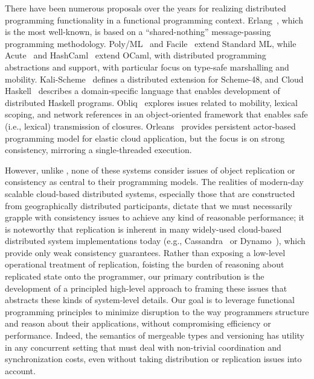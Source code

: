 There have been numerous proposals over the years for realizing
distributed programming functionality in a functional programming
context.  Erlang~\cite{Armstrong}, which is the most well-known, is
based on a ``shared-nothing'' message-passing programming methodology.
Poly/ML~\cite{Mat97} and Facile~\cite{TLK+93} extend Standard ML,
while Acute~\cite{SLW+05} and HashCaml~\cite{BSS+06} extend OCaml,
with distributed programming abstractions and support, with particular
focus on type-safe marshalling and mobility.  Kali-Scheme~\cite{CJK95}
defines a distributed extension for Scheme-48, and Cloud
Haskell~\cite{EBPJ11} describes a domain-specific language that
enables development of distributed Haskell
programs. Obliq~\cite{Car95} explores issues related to mobility,
lexical scoping, and network references in an object-oriented
framework that enables safe (i.e., lexical) transmission of
closures. Orleans~\cite{Orleans} provides persistent actor-based
programming model for elastic cloud application, but the focus is on
strong consistency, mirroring a single-threaded execution.

However, unlike \name, none of these systems consider issues of object
replication or consistency as central to their programming models. The
realities of modern-day scalable cloud-based distributed systems,
especially those that are constructed from geographically distributed
participants, dictate that we must necessarily grapple with
consistency issues to achieve any kind of reasonable performance; it
is noteworthy that replication is inherent in many widely-used
cloud-based distributed system implementations today (e.g.,
Cassandra~\cite{Cassandra} or Dynamo~\cite{Dynamo}), which provide
only weak consistency guarantees.  Rather than exposing a low-level
operational treatment of replication, foisting the burden of reasoning
about replicated state onto the programmer, our primary contribution
is the development of a principled high-level approach to framing
these issues that abstracts these kinds of system-level details.  Our
goal is to leverage functional programming principles to minimize
disruption to the way programmers structure and reason about their
applications, without compromising efficiency or performance.  Indeed,
the semantics of mergeable types and versioning has utility in any
concurrent setting that must deal with non-trivial coordination and
synchronization costs, even without taking distribution or replication
issues into account.

